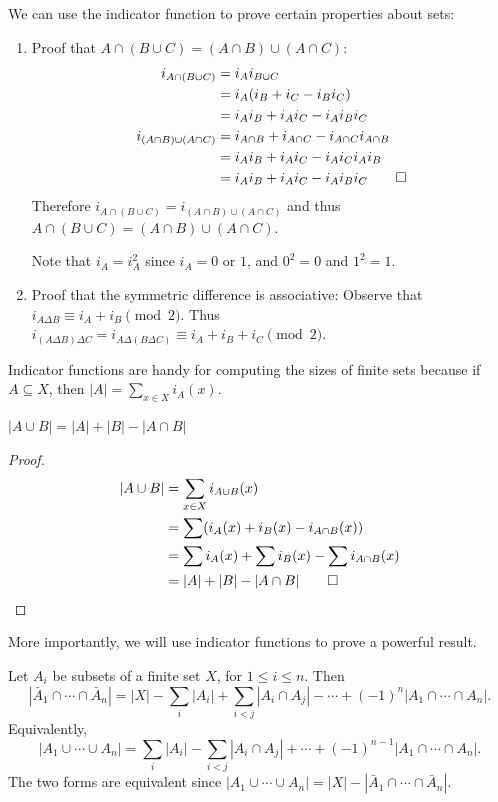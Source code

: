 \documentclass[a4paper]{article}
\begin{document}
\begin{eg}
  We can use the indicator function to prove certain properties about sets:
  \begin{enumerate}
    \item Proof that $A\cap(B\cup C) = (A\cap B)\cup (A\cap C)$:
      \begin{align*}
        i_{A\cap (B\cup C)} &= i_Ai_{B\cup C}\\
        &= i_A(i_B + i_C - i_Bi_C)\\
        &= i_Ai_B + i_Ai_C - i_Ai_Bi_C\\
        i_{(A\cap B)\cup (A\cap C)} &= i_{A\cap B} + i_{A\cap C} - i_{A\cap C}i_{A\cap B}\\
        &= i_Ai_B + i_Ai_C - i_Ai_Ci_Ai_B\\
        &= i_Ai_B + i_Ai_C - i_Ai_Bi_C \qedhere
      \end{align*}
      Therefore $i_{A\cap (B\cup C)} = i_{(A\cap B)\cup (A\cap C)}$ and thus $A\cap(B\cup C) = (A\cap B)\cup (A\cap C)$.

      Note that $i_A = i_A^2$ since $i_A = 0 $ or $1$, and $0^2 = 0$ and $1^2 = 1$.
    \item Proof that the symmetric difference is associative: Observe that $i_{A\Delta B} \equiv i_A + i_B \pmod 2$. Thus $i_{(A\Delta B)\Delta C} = i_{A\Delta(B\Delta C)} \equiv i_A + i_B + i_C \pmod2$.
  \end{enumerate}
\end{eg}
Indicator functions are handy for computing the sizes of finite sets because if $A\subseteq X$, then $|A| = \sum\limits_{x\in X}i_A(x)$.

\begin{prop}
  $|A\cup B| = |A| + |B| - |A\cap B|$
\end{prop}

\begin{proof}
  \begin{align*}
    |A\cup B| &= \sum_{x\in X} i_{A\cup B}(x)\\
    &= \sum (i_A(x) + i_B(x) - i_{A\cap B}(x))\\
    &= \sum i_A(x) + \sum i_B(x) - \sum i_{A\cap B}(x)\\
    &= |A| + |B| - |A\cap B|\qedhere
  \end{align*}
\end{proof}

More importantly, we will use indicator functions to prove a powerful result.
\begin{thm}
  Let $A_i$ be subsets of a finite set $X$, for $1 \leq i\leq n$. Then
  \[
    |\bar A_1\cap \cdots \cap \bar A_n| = |X| - \sum_i |A_i| + \sum_{i < j}|A_i\cap A_j| - \cdots + (-1)^n|A_1\cap \cdots \cap A_n|.
  \]
  Equivalently,
  \[
    |A_1\cup \cdots \cup A_n| = \sum_i|A_i| - \sum_{i < j}|A_i\cap A_j| + \cdots +(-1)^{n-1}|A_1\cap \cdots \cap A_n|.
  \]
  The two forms are equivalent since $|A_1\cup\cdots\cup A_n| = |X| - |\bar A_1\cap \cdots \cap \bar A_n|$.
\end{thm}
\end{document}
